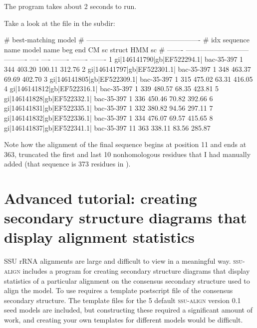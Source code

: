 
The program takes about 2 seconds to run. 

Take a look at the  file in the 
subdir:

\begin{sreoutput}
#                                                      best-matching model                 
#                                       -------------------------------------------------  
#     idx  sequence name                model name   beg   end    CM sc   struct   HMM sc
# -------  ---------------------------  ----------  ----  ----  -------  -------  -------
        1  gi|146141790|gb|EF522294.1|  bac-35-397     1   344   403.20   100.11   312.76
        2  gi|146141797|gb|EF522301.1|  bac-35-397     1   348   463.37    69.69   402.70
        3  gi|146141805|gb|EF522309.1|  bac-35-397     1   315   475.02    63.31   416.05
        4  gi|146141812|gb|EF522316.1|  bac-35-397     1   339   480.57    68.35   423.81
        5  gi|146141828|gb|EF522332.1|  bac-35-397     1   336   450.46    70.82   392.66
        6  gi|146141831|gb|EF522335.1|  bac-35-397     1   332   380.82    94.56   297.11
        7  gi|146141832|gb|EF522336.1|  bac-35-397     1   334   476.07    69.57   415.65
        8  gi|146141837|gb|EF522341.1|  bac-35-397    11   363   338.11    83.56   285.87
\end{sreoutput}

Note how the alignment of the final sequence begins at position 11 and
ends at 363, truncated the first and last 10 nonhomologous residues
that I had manually added (that sequence is 373 residues in
).

\section{Advanced tutorial: creating secondary structure diagrams that
  display alignment statistics}

SSU rRNA alignments are large and difficult to view in a meaningful
way. \textsc{ssu-align} includes a program  for
creating secondary structure diagrams that display statistics of a
particular alignment on the consensus secondary structure used to
align the model. To use  requires a template
postscript file of the consensus secondary structure. The template
files for the 5 default \textsc{ssu-align} version 0.1 seed models are
included, but constructing these required a significant amount of
work, and creating your own templates for different models would be
difficult. 

